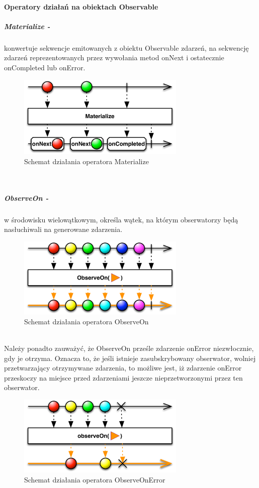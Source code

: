 \documentclass[12pt,oneside,a4paper]{report}
\begin{document}
\paragraph{Operatory działań na obiektach Observable}
\subparagraph{Materialize -}konwertuje sekwencje emitowanych z obiektu Observable zdarzeń, na sekwencję zdarzeń reprezentowanych przez wywołania metod onNext i ostatecznie onCompleted lub onError.
\begin{figure}[ht!]
	\centering
	\includegraphics[width=8cm]{materialize}
	\caption{Schemat działania operatora Materialize}
	\label{materialize}
\end{figure}\\
\subparagraph{ObserveOn -}w środowisku wielowątkowym, określa wątek, na którym obserwatorzy będą nasłuchiwali na generowane zdarzenia. 
\begin{figure}[ht!]
	\centering
	\includegraphics[width=8cm]{observeOn}
	\caption{Schemat działania operatora ObserveOn}
	\label{observeOn}
\end{figure}\\
Należy ponadto zauważyć, że ObserveOn prześle zdarzenie onError niezwłocznie, gdy je otrzyma. Oznacza to, że jeśli istnieje zasubskrybowany obserwator, wolniej przetwarzający otrzymywane zdarzenia, to możliwe jest, iż zdarzenie onError przeskoczy na miejsce przed zdarzeniami jeszcze nieprzetworzonymi przez ten obserwator. 
\begin{figure}[ht!]
	\centering
	\includegraphics[width=8cm]{observeOnError}
	\caption{Schemat działania operatora ObserveOnError}
	\label{observeOnError}
\end{figure}\\
\end{document}
